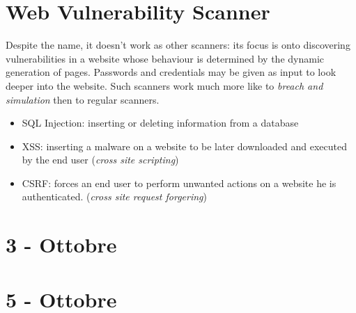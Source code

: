 \section{Web Vulnerability Scanner}
Despite the name, it doesn't work as other scanners: 
its focus is onto discovering vulnerabilities in a website whose behaviour is determined by the dynamic generation of pages.
Passwords and credentials may be given as input to look deeper into the website.
Such scanners work much more like to \textit{breach and simulation} then to regular scanners.

\begin{itemize}
    \item SQL Injection: inserting or deleting information from a database
    \item XSS: inserting a malware on a website to be later downloaded and executed by the end user (\textit{cross site scripting})
    \item CSRF: forces an end user to perform unwanted actions on a website he is authenticated. (\textit{cross site request forgering}) 
\end{itemize}

\section*{3 - Ottobre}

\section*{5 - Ottobre}
